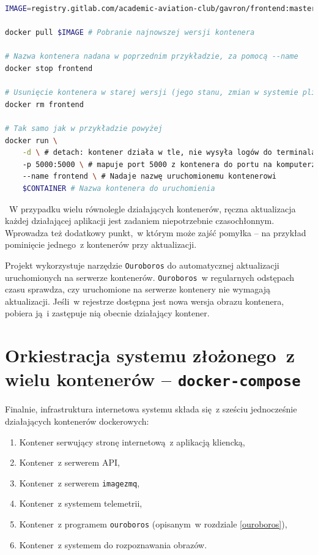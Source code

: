 \begin{lstlisting}[language=bash, label=list:docker_update_container,caption={Aktualizacja kontenerów}, basicstyle=\footnotesize\ttfamily]
IMAGE=registry.gitlab.com/academic-aviation-club/gavron/frontend:master

docker pull $IMAGE # Pobranie najnowszej wersji kontenera

# Nazwa kontenera nadana w poprzednim przykładzie, za pomocą --name
docker stop frontend

# Usunięcie kontenera w starej wersji (jego stanu, zmian w systemie plików)
docker rm frontend

# Tak samo jak w przykładzie powyżej
docker run \
    -d \ # detach: kontener działa w tle, nie wysyła logów do terminala
    -p 5000:5000 \ # mapuje port 5000 z kontenera do portu na komputerze  
    --name frontend \ # Nadaje nazwę uruchomionemu kontenerowi
    $CONTAINER # Nazwa kontenera do uruchomienia 
\end{lstlisting}
~W przypadku wielu równolegle działających kontenerów, ręczna aktualizacja 
każdej działającej aplikacji jest zadaniem niepotrzebnie czasochłonnym.
Wprowadza też dodatkowy punkt,~w którym może zajść pomyłka -- na przykład
pominięcie jednego~z kontenerów przy aktualizacji.

Projekt wykorzystuje narzędzie \texttt{Ouroboros} do automatycznej aktualizacji
uruchomionych na serwerze kontenerów. \texttt{Ouroboros}~w regularnych odstępach
czasu sprawdza, czy uruchomione na serwerze kontenery nie wymagają aktualizacji.
Jeśli~w rejestrze dostępna jest nowa wersja obrazu kontenera, pobiera ją~i zastępuje
nią obecnie działający kontener.

\section{Orkiestracja systemu złożonego~z wielu kontenerów -- \texttt{docker-compose}}

Finalnie, infrastruktura internetowa systemu składa się~z sześciu
jednocześnie działających kontenerów dockerowych:

\begin{enumerate}
  \item Kontener serwujący stronę internetową~z aplikacją kliencką,
  \item Kontener~z serwerem API,
  \item Kontener~z serwerem \texttt{imagezmq},
  \item Kontener~z systemem telemetrii,
  \item Kontener~z programem \texttt{ouroboros} (opisanym~w rozdziale \ref{ouroboros}),
  \item Kontener~z systemem do rozpoznawania obrazów. 
\end{enumerate}

